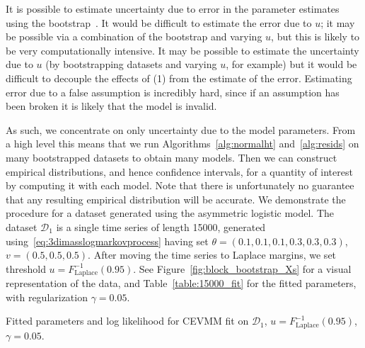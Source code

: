 \documentclass[11pt,twoside,openany]{book}
\newcommand{\D}{\mathcal{D}}
\numberwithin{Theorem}{chapter}
\numberwithin{Definition}{chapter}
\numberwithin{Lemma}{chapter}
\numberwithin{Algorithm}{chapter}
\numberwithin{equation}{chapter}
\begin{document}
It is possible to estimate uncertainty due to error in the parameter
estimates using the bootstrap~\citep{efron1994introduction}.
It would be difficult to estimate the error due to $u$; it may be possible via
a combination of the bootstrap and varying $u$, but this is likely to be very
computationally intensive.
It may be possible to estimate the uncertainty due to $u$ (by bootstrapping
datasets and varying $u$, for example) but it would be difficult
to decouple the effects of (1) from the estimate of the error.
Estimating error due to a false assumption is incredibly hard,
since if an assumption has been broken it is likely that the model is invalid.

As such, we concentrate on only uncertainty due to the model parameters. From a
high level this means that we run Algorithms~\ref{alg:normalht}
and~\ref{alg:resids} on many bootstrapped datasets to obtain many models. Then
we can construct empirical distributions, and hence confidence intervals, for a
quantity of interest by computing it with each model. Note that there is unfortunately no
guarantee that any resulting empirical distribution will be accurate.
We demonstrate the procedure for
a dataset generated using the asymmetric logistic model.
The dataset $\D_1$ is a single time series of length 15000, generated
using~\eqref{eq:3dimasslogmarkovprocess} having set
$\theta = (0.1,0.1,0.1,0.3,0.3,0.3)$, $v = (0.5,0.5,0.5)$. After moving the time series to Laplace
margins, we set threshold $u = F_{\text{Laplace}}^{-1}(0.95)$. See
Figure~\ref{fig:block_bootstrap_Xs} for a visual representation of the data, and
Table~\ref{table:15000_fit} for the fitted parameters, with regularization $\gamma = 0.05$.

\begin{table}[htp]
  \centering
    
\caption{Fitted parameters and log likelihood for CEVMM fit on $\D_1$, $u=F_{\text{Laplace}}^{-1}(0.95)$, $\gamma = 0.05$.\label{table:15000_fit}}
\end{table}
\end{document}
